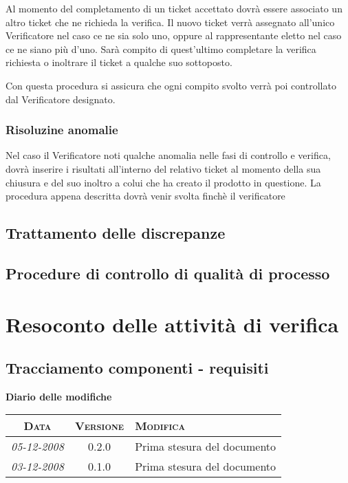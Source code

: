 \documentclass[11pt,a4paper]{article}
\newcommand{\modifiche} 
{
\newpage
\begin{center}
\textbf{Diario delle modifiche} \\
\bigskip
\begin{tabular}{|c|c|p{0.51\textwidth}|}
\hline
\textsc{Data} & \textsc{Versione} & \textsc{Modifica} \\
\hline
\hline
\textit{05-12-2008} & 0.2.0 & Prima stesura del documento \\
\hline
\textit{03-12-2008} & 0.1.0 & Prima stesura del documento \\
\hline
\end{tabular}
\end{center}
}
\begin{document}
Al momento del completamento di un ticket accettato dovrà essere associato un altro ticket che ne richieda la verifica. Il nuovo ticket verrà assegnato all'unico Verificatore nel caso ce ne sia solo uno, oppure al rappresentante eletto nel caso ce ne siano più d'uno. Sarà compito di quest'ultimo completare la verifica richiesta o inoltrare il ticket a qualche suo sottoposto.

Con questa procedura si assicura che ogni compito svolto verrà poi controllato dal Verificatore designato.
\subsubsection{Risoluzine anomalie}
Nel caso il Verificatore noti qualche anomalia nelle fasi di controllo e verifica, dovrà inserire i risultati all'interno del relativo ticket al momento della sua chiusura e del suo inoltro a colui che ha creato il prodotto in questione.
La procedura appena descritta dovrà venir svolta finchè il verificatore 


\subsection{Trattamento delle discrepanze}
\subsection{Procedure di controllo di qualità di processo}
\section{Resoconto delle attività di verifica}
\subsection{Tracciamento componenti - requisiti}

\modifiche
\end{document}
